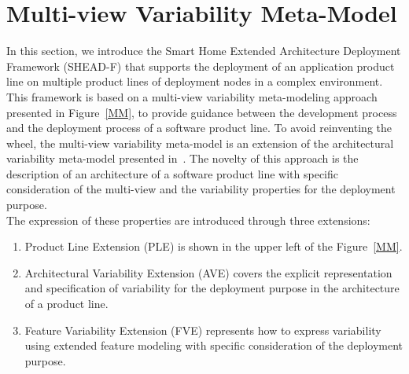 \documentclass{llncs}
\begin{document}
\section{Multi-view Variability Meta-Model} \label{sec2}
In this section, we introduce the Smart Home Extended Architecture Deployment Framework (SHEAD-F) that supports the deployment of an application product line on multiple product lines of deployment nodes in a complex environment.
This framework is based on a multi-view variability meta-modeling approach presented in Figure~\ref{MM}, to provide guidance between the development process and the deployment process of a software product line. To avoid reinventing the wheel, the multi-view variability meta-model is an extension of the architectural variability meta-model presented in~\cite{thiel2002systematic}. The novelty of this approach is the description of an architecture of a software product line with specific consideration of the multi-view and the variability properties for the deployment purpose.\\
The expression of these properties are introduced through three extensions:
\begin{enumerate}
	\item Product Line Extension (PLE) is shown in the upper left of the Figure~\ref{MM}.%
	\item Architectural Variability Extension (AVE) covers the explicit representation and specification of variability for the deployment purpose in the architecture of a product line.
	\item Feature Variability Extension (FVE) represents how to express variability using extended feature modeling with specific consideration of the deployment purpose.
\end{enumerate}
\end{document}
